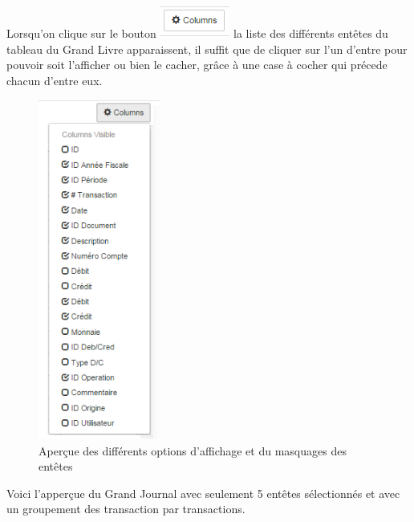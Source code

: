 \documentclass[12pt,a4paper]{report}
\begin{document}
\newpage
Lorsqu'on clique sur le bouton  \includegraphics[scale=0.7]{pic/ColumnFilter.png}  la liste des différents entêtes du tableau du Grand Livre apparaissent, il suffit que de cliquer sur l'un d'entre pour pouvoir soit l'afficher ou bien le cacher, grâce à une case à cocher qui précede chacun d'entre eux.

\begin{figure}[h]
\begin{center}
\includegraphics[width=4cm]{pic/ColumnGeneraLedger.png}
\end{center}
\caption{Aperçue des différents options d'affichage et du masquages des entêtes}
\label{Aperçue des différents options d'affichage et du masquages des entêtes}
\end{figure}

\newpage
Voici l'apperçue du Grand Journal avec seulement 5 entêtes sélectionnés et avec un groupement des transaction par transactions.
\end{document}
